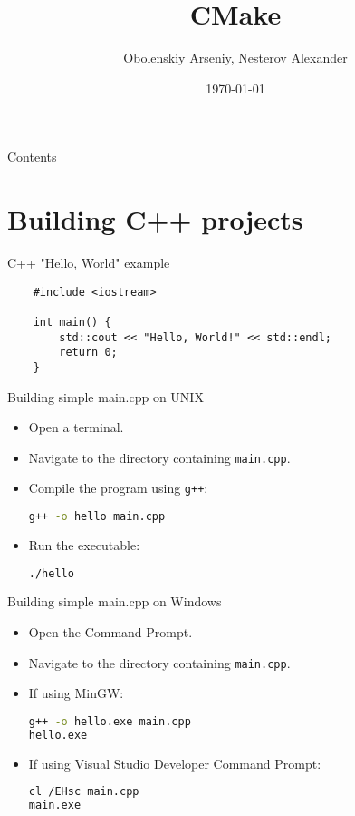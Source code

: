 \documentclass{beamer}
\title[CMake]{CMake}
\author{Obolenskiy Arseniy, Nesterov Alexander}
\institute{ITLab}
\date{\today}
\begin{document}
\begin{frame}
    \titlepage
\end{frame}

\begin{frame}{Contents}
    \tableofcontents
\end{frame}

\section{Building C++ projects}

\begin{frame}[fragile]{C++ "Hello, World" example}
  \lstset{style=CStyle, caption=Hello World example}
  \begin{lstlisting}
    #include <iostream>

    int main() {
        std::cout << "Hello, World!" << std::endl;
        return 0;
    }
  \end{lstlisting}
\end{frame}

\begin{frame}[fragile]{Building simple main.cpp on UNIX}
  \begin{itemize}
    \item Open a terminal.
    \item Navigate to the directory containing \texttt{main.cpp}.
    \item Compile the program using \texttt{g++}:
    \begin{lstlisting}[language=bash]
g++ -o hello main.cpp
    \end{lstlisting}
    \item Run the executable:
    \begin{lstlisting}[language=bash]
./hello
    \end{lstlisting}
  \end{itemize}
\end{frame}

\begin{frame}[fragile]{Building simple main.cpp on Windows}
  \begin{itemize}
    \item Open the Command Prompt.
    \item Navigate to the directory containing \texttt{main.cpp}.
    \item If using MinGW:
    \begin{lstlisting}[language=bash]
g++ -o hello.exe main.cpp
hello.exe
    \end{lstlisting}
    \item If using Visual Studio Developer Command Prompt:
    \begin{lstlisting}[language=bash]
cl /EHsc main.cpp
main.exe
    \end{lstlisting}
  \end{itemize}
\end{frame}
\end{document}
